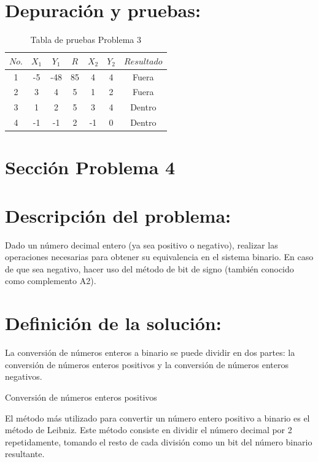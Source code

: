 \documentclass{IEEEcsmag}
\begin{document}
\section*{Depuración y pruebas:}
\begin{table}[h]
     \centering
     \begin{tabular}{|c|c|c|c|c|c|c|}
\hline
\textbf{\(No.\)} & \textbf{$X_1$ } & \textbf{$Y_1$ } & \textbf{$R$ }& \textbf{$X_2$ } & \textbf{$Y_2$ } & \textbf{\(Resultado\)} \\
\hline
1 & -5 & -48 & 85 & 4 & 4 & Fuera \\
        \hline
        2 & 3 & 4 & 5 & 1 & 2 & Fuera \\
        \hline
        3 & 1 & 2 & 5 & 3 & 4 & Dentro \\
        \hline
        4 & -1 & -1 & 2 & -1 & 0 & Dentro \\
\hline
\end{tabular}
     \label{tab:my_label}
     \caption{Tabla de pruebas Problema 3}
 \end{table}

\section{Sección Problema 4}
\section*{Descripción del problema:}
Dado un número decimal entero (ya sea positivo o negativo), realizar las operaciones necesarias para obtener su equivalencia en el sistema binario. En caso de que sea negativo, hacer uso del método de bit de signo (también conocido como complemento A2).


\section*{Definición de la solución:}
La conversión de números enteros a binario se puede dividir en dos partes: la conversión de números enteros positivos y la conversión de números enteros negativos.

Conversión de números enteros positivos

El método más utilizado para convertir un número entero positivo a binario es el método de Leibniz. Este método consiste en dividir el número decimal por 2 repetidamente, tomando el resto de cada división como un bit del número binario resultante.
\end{document}
